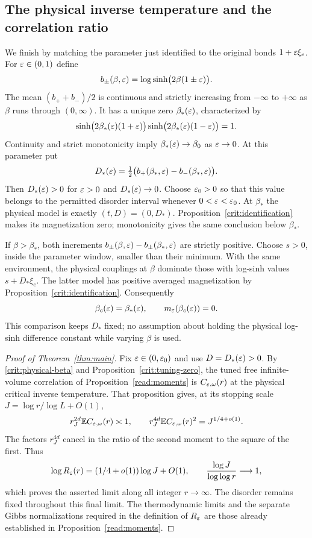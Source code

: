 \subsection{The physical inverse temperature and the correlation ratio}

We finish by matching the parameter just identified to the original
bonds $1+\varepsilon\xi_e$.  For $\varepsilon\in(0,1)$ define
\[
 b_\pm(\beta,\varepsilon)
       =\log\sinh\bigl(2\beta(1\pm\varepsilon)\bigr).
\]
The mean $(b_++b_-)/2$ is continuous and strictly increasing from
$-\infty$ to $+\infty$ as $\beta$ runs through $(0,\infty)$.  It has
a unique zero $\beta_*(\varepsilon)$, characterized by
\begin{equation}\label{crit:physical-equation}
 \sinh\bigl(2\beta_*(\varepsilon)(1+\varepsilon)\bigr)
 \sinh\bigl(2\beta_*(\varepsilon)(1-\varepsilon)\bigr)=1.
\end{equation}
Continuity and strict monotonicity imply
$\beta_*(\varepsilon)\to\beta_0$ as $\varepsilon\to0$.  At this parameter
put
\[
 D_*(\varepsilon)=\tfrac12
       \bigl(b_+(\beta_*,\varepsilon)-b_-(\beta_*,\varepsilon)\bigr).
\]
Then $D_*(\varepsilon)>0$ for $\varepsilon>0$ and
$D_*(\varepsilon)\to0$.  Choose $\varepsilon_0>0$ so that this value belongs
to the permitted disorder interval whenever $0<\varepsilon<\varepsilon_0$.
At $\beta_*$ the physical model is exactly $(t,D)=(0,D_*)$.
Proposition~\ref{crit:identification} makes its magnetization zero;
monotonicity gives the same conclusion below $\beta_*$.

If $\beta>\beta_*$, both increments
$b_\pm(\beta,\varepsilon)-b_\pm(\beta_*,\varepsilon)$ are strictly positive.
Choose $s>0$, inside the parameter window, smaller than their minimum.
With the same environment, the physical couplings at $\beta$ dominate
those with log-sinh values $s+D_*\xi_e$.  The latter model has positive
averaged magnetization by Proposition~\ref{crit:identification}.
Consequently
\begin{equation}\label{crit:physical-beta}
 \beta_c(\varepsilon)=\beta_*(\varepsilon),
 \qquad m_\varepsilon(\beta_c(\varepsilon))=0.
\end{equation}
This comparison keeps $D_*$ fixed; no assumption about holding the
physical log-sinh difference constant while varying $\beta$ is used.

\begin{proof}[Proof of Theorem~\ref{thm:main}]
Fix $\varepsilon\in(0,\varepsilon_0)$ and use $D=D_*(\varepsilon)>0$.
By \eqref{crit:physical-beta} and Proposition~\ref{crit:tuning-zero},
the tuned free infinite-volume correlation of
Proposition~\ref{read:moments} is $C_{\varepsilon,\omega}(r)$ at the physical
critical inverse temperature.  That proposition gives, at its stopping
scale $J=\log r/\log L+O(1)$,
\[
 r_J^{2d}\mathbb E C_{\varepsilon,\omega}(r)\asymp1,
 \qquad
 r_J^{4d}\mathbb E C_{\varepsilon,\omega}(r)^2=J^{1/4+o(1)}.
\]
The factors $r_J^{4d}$ cancel in the ratio of the second moment to the
square of the first.  Thus
\[
 \log R_\varepsilon(r)=(1/4+o(1))\log J+O(1),
 \qquad
 \frac{\log J}{\log\log r}\longrightarrow1,
\]
which proves the asserted limit along all integer $r\to\infty$.
The disorder remains fixed throughout this final limit.  The
thermodynamic limits and the separate Gibbs normalizations required
in the definition of $R_\varepsilon$ are those already established in
Proposition~\ref{read:moments}.
\end{proof}

